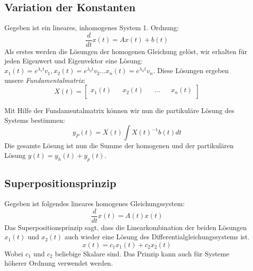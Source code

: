 \subsection{Variation der Konstanten}
Gegeben ist ein lineares, inhomogenes System 1. Ordnung: \\
\begin{equation*}
\frac{d}{dt}x(t) = Ax(t) + b(t) 
\end{equation*}
Als erstes werden die Lösungen der homogenen Gleichung gelöst, wir erhalten für jeden Eigenwert und Eigenvektor eine Lösung: 
$x_1(t) = e^{\lambda_1t}v_1,x_2(t) = e^{\lambda_2t}v_2...x_n(t) = e^{\lambda_nt}v_n$. 
Diese Lösungen ergeben unsere \emph{Fundamentalmatrix}:\\
\begin{equation*}
X(t) = 
	\begin{bmatrix} 
	        x_1(t) && x_2(t) && ... && x_n(t)\\    
	\end{bmatrix}
\end{equation*}

Mit Hilfe der Fundamentalmatrix können wir nun die partikuläre Lösung des Systems bestimmen:\\
\begin{equation*}
y_P(t) = X(t) \int{X(t)^{-1}b(t)dt}
\end{equation*}
Die gesamte Lösung ist nun die Summe der homogenen und der partikulären Lösung $y(t) = y_h(t) + y_p(t)$.


\subsection{Superpositionsprinzip}
Gegeben ist folgendes lineares homogenes Gleichungssystem:
\begin{equation*}
\frac{d}{dt}x(t) = A(t)x(t)
\end{equation*}
Das Superpositionsprinzip sagt, dass die Linearkombination der beiden Lösungen $x_1(t)$ und $x_2(t)$ auch wieder eine Lösung des Differentialgleichungssystems ist. 
\begin{equation*}
	x(t) = c_1 x_1(t) + c_2 x_2(t)
\end{equation*}
Wobei $c_1$ und $c_2$ beliebige Skalare sind. 
Das Prinzip kann auch für Systeme höherer Ordnung verwendet werden. \\

